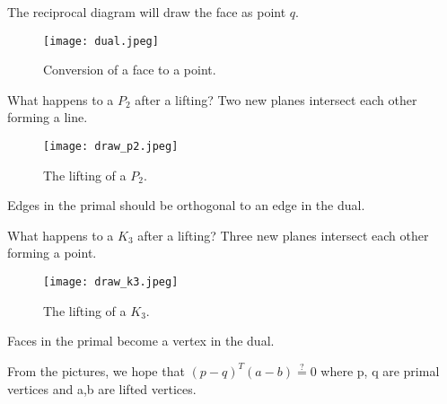 \documentclass{article}
\begin{document}
    
    The reciprocal diagram will draw the face as point $q$.
    
    \begin{figure}[H]
        \centering
        \texttt{[image: dual.jpeg]}
        \caption{Conversion of a face to a point.}
    \end{figure}
    
    What happens to a $P_2$ after a lifting? Two new planes intersect each other forming a line.
    
    \begin{figure}[H]
        \centering
        \texttt{[image: draw\_p2.jpeg]}
        \caption{The lifting of a $P_2$.}
    \end{figure}
    
    Edges in the primal should be orthogonal to an edge in the dual.
    
    What happens to a $K_3$ after a lifting? Three new planes intersect each other forming a point.
    
    \begin{figure}[H]
        \centering
        \texttt{[image: draw\_k3.jpeg]}
        \caption{The lifting of a $K_3$.}
    \end{figure}
    
    Faces in the primal become a vertex in the dual.
    
    \begin{proposition}
        From the pictures, we hope that $(p-q)^T(a-b) \overset{?}{=}0$ where p, q are primal vertices and a,b are lifted vertices.
    \end{proposition}
    
\end{document}
